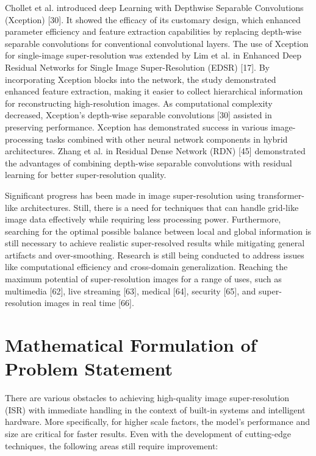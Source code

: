 \documentclass[twocolumn]{svjour3}          %
\begin{document}
Chollet et al. introduced deep Learning with Depthwise Separable Convolutions (Xception) [30]. It showed the efficacy of its customary design, which enhanced parameter efficiency and feature extraction capabilities by replacing depth-wise separable convolutions for conventional convolutional layers. The use of Xception for single-image super-resolution was extended by Lim et al. in Enhanced Deep Residual Networks for Single Image Super-Resolution (EDSR) [17]. By incorporating Xception blocks into the network, the study demonstrated enhanced feature extraction, making it easier to collect hierarchical information for reconstructing high-resolution images. As computational complexity decreased, Xception's depth-wise separable convolutions [30] assisted in preserving performance. Xception has demonstrated success in various image-processing tasks combined with other neural network components in hybrid architectures. Zhang et al. in Residual Dense Network (RDN) [45] demonstrated the advantages of combining depth-wise separable convolutions with residual learning for better super-resolution quality.

Significant progress has been made in image super-resolution using transformer-like architectures. Still, there is a need for techniques that can handle grid-like image data effectively while requiring less processing power. Furthermore, searching for the optimal possible balance between local and global information is still necessary to achieve realistic super-resolved results while mitigating general artifacts and over-smoothing. Research is still being conducted to address issues like computational efficiency and cross-domain generalization. Reaching the maximum potential of super-resolution images for a range of uses, such as multimedia [62], live streaming [63], medical [64], security [65],  and super-resolution images in real time [66].

\section{Mathematical Formulation of Problem Statement}

There are various obstacles to achieving high-quality image super-resolution (ISR) with immediate handling in the context of built-in systems and intelligent hardware. More specifically, for higher scale factors, the model's performance and size are critical for faster results. Even with the development of cutting-edge techniques, the following areas still require improvement:
\end{document}
